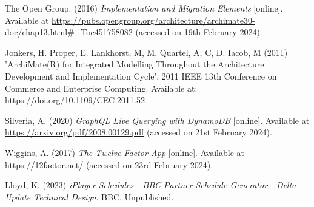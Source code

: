 \noindent The Open Group. (2016) \textit{Implementation and Migration Elements} [online]. Available at \url{https://pubs.opengroup.org/architecture/archimate30-doc/chap13.html#_Toc451758082} (accessed on 19th February 2024).
\vspace{0.2cm}

\noindent Jonkers, H. Proper, E. Lankhorst, M, M. Quartel, A, C, D. Iacob, M (2011) 'ArchiMate(R) for Integrated Modelling Throughout the Architecture Development and Implementation Cycle', 2011 IEEE 13th Conference on Commerce and Enterprise Computing. Available at: \url{https://doi.org/10.1109/CEC.2011.52}
\vspace{0.2cm}

\noindent Silveria, A. (2020) \textit{GraphQL Live Querying with DynamoDB} [online]. Available at \url{https://arxiv.org/pdf/2008.00129.pdf} (accessed on 21st February 2024).
\vspace{0.2cm}

\noindent Wiggins, A. (2017) \textit{The Twelve-Factor App} [online]. Available at \url{https://12factor.net/} (accessed on 23rd February 2024).
\vspace{0.2cm}

\noindent Lloyd, K. (2023) \textit{iPlayer Schedules - BBC Partner Schedule Generator - Delta Update Technical Design}. BBC. Unpublished.
\vspace{0.2cm}

\newpage
